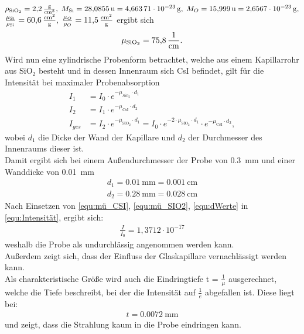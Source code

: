 \documentclass[a4paper,twoside,final]{article}
\begin{document}
$\rho_\text{SiO$_2$} = \SI{2,2}{\frac{\gram}{\centi\meter\cubed}},\; M_\text{Si} = \SI{28,0855}{\text{u}}=\SI{4,66371E-23}{\gram},\; M_{O} = \SI{15,999}{\text{u}}=\SI{2,6567E-23
}{\gram},$ $\frac{\mu_\text{Si}}{\rho_\text{Si}} = \SI{60,6}{\frac{\centi\meter\squared}{\gram}}, \;\frac{\mu_{O}}{\rho_{O}} = \SI{11,5}{\frac{\centi\meter\squared}{\gram}} $
ergibt sich
\begin{align}\label{equ:mü_SIO2}
\mu_\text{SiO$_2$}= \SI{75,8}{\frac{1}{\centi\meter}}.
\end{align}
Wird nun eine zylindrische Probenform betrachtet, welche aus einem Kapillarrohr aus SiO$_2$ besteht und in dessen Innenraum sich CsI befindet, gilt für die Intensität bei maximaler Probenabsorption
\begin{align}\label{equ:Intensität}
  I_1 &= I_0 \cdot e^{-\mu_{Si0_2}\cdot d_1} \nonumber\\
  I_2 &= I_1 \cdot e^{-\mu_\text{CsI}\cdot d_2}\nonumber \\
  I_{ges}& = I_2 \cdot e^{-\mu_\text{SiO$_2$}\cdot d_1} = I_0 \cdot e^{-2\cdot\mu_\text{SiO$_2$}\cdot d_1}\cdot e^{-\mu_\text{CsI}\cdot d_2},
\end{align}
wobei $d_1$ die Dicke der Wand der Kapillare und $d_2$ der Durchmesser des Innenraums dieser ist. \\
Damit ergibt sich bei einem Außendurchmesser der Probe von \SI{0,3}{\milli\meter} und einer Wanddicke von \SI{0,01}{\milli\meter}
\begin{align}\label{equ:dWerte}
  d_1 = \SI{0,01}{\milli\meter}=\SI{0,001}{\centi\meter}\\
  d_2 = \SI{0,28}{\milli\meter}=\SI{0,028}{\centi\meter}
\end{align}
Nach Einsetzen von \eqref{equ:mü_CSI}, \eqref{equ:mü_SIO2}, \eqref{equ:dWerte} in \eqref{equ:Intensität}, ergibt sich:
\begin{align}
  \frac{I}{I_0} = 1,3712\cdot 10^{-17}
\end{align}
weshalb die Probe als undurchlässig angenommen werden kann.\\
Außerdem zeigt sich, dass der Einfluss der Glaskapillare vernachlässigt werden kann.\\
Als charakteristische Größe wird auch die Eindringtiefe t = $\frac{1}{\mu}$ ausgerechnet, welche die Tiefe beschreibt, bei der die Intensität auf $\frac{1}{e}$ abgefallen ist.  Diese liegt bei:
\begin{align}
  t = \SI{0,0072}{\milli\meter}
\end{align}
und zeigt, dass die Strahlung kaum in die Probe eindringen kann.
\end{document}
